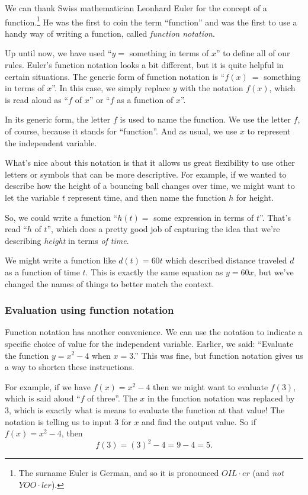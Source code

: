 We can thank Swiss mathematician Leonhard Euler for the concept of a function.\footnote{The surname Euler is German, and so it is pronounced $OIL \cdot er$ (and \textit{not} $YOO \cdot ler$).} He was the first to coin the term ``function'' and was the first to use a handy way of writing a function, called \textit{function notation}.

Up until now, we have used ``$y=$ something in terms of $x$'' to define all of our rules. Euler's function notation looks a bit different, but it is quite helpful in certain situations. The generic form of function notation is ``$f(x)~=$ something in terms of $x$''. In this case, we simply replace $y$ with the notation $f(x)$, which is read aloud as ``$f$ of $x$'' or ``$f$ as a function of $x$''.

In its generic form, the letter $f$ is used to name the function. We use the letter $f$, of course, because it stands for ``function''. And as usual, we use $x$ to represent the independent variable.

What's nice about this notation is that it allows us great flexibility to use other letters or symbols that can be more descriptive. For example, if we wanted to describe how the height of a bouncing ball changes over time, we might want to let the variable $t$ represent time, and then name the function $h$ for height.

So, we could write a function ``$h(t) =$ some expression in terms of $t$''. That's read ``$h$ of $t$'', which does a pretty good job of capturing the idea that we're describing \textit{height} in terms \textit{of time}.

We might write a function like $d(t) = 60t$ which described distance traveled $d$ as a function of time $t$. This is exactly the same equation as $y = 60x$, but we've changed the names of things to better match the context.

\subsubsection{Evaluation using function notation}

Function notation has another convenience. We can use the notation to indicate a specific choice of value for the independent variable. Earlier, we said: ``Evaluate the function $y = x^2-4$ when $x = 3$.'' This was fine, but function notation gives us a way to shorten these instructions.

For example, if we have $f(x) = x^2-4$ then we might want to evaluate $f(3)$, which is said aloud ``$f$ of three''. The $x$ in the function notation was replaced by 3, which is exactly what is means to evaluate the function at that value! The notation is telling us to input 3 for $x$ and find the output value. So if $f(x) = x^2 - 4$, then \[f(3) = (3)^2 - 4 = 9 - 4 = 5.\]


